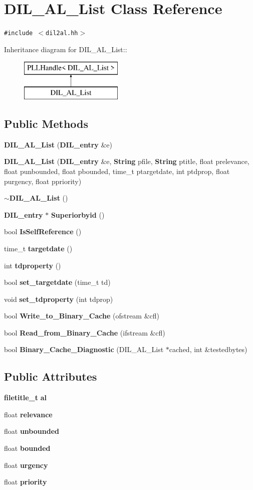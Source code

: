 \section{DIL\_\-AL\_\-List  Class Reference}
\label{classDIL__AL__List}
{\tt \#include $<$dil2al.hh$>$}

Inheritance diagram for DIL\_\-AL\_\-List::\begin{figure}[H]
\begin{center}
\leavevmode
\includegraphics[height=2cm]{classDIL__AL__List}
\end{center}
\end{figure}
\subsection*{Public Methods}
\begin{CompactItemize}
\item 
{\bf DIL\_\-AL\_\-List} ({\bf DIL\_\-entry} \&e)
\item 
{\bf DIL\_\-AL\_\-List} ({\bf DIL\_\-entry} \&e, {\bf String} pfile, {\bf String} ptitle, float prelevance, float punbounded, float pbounded, time\_\-t ptargetdate, int ptdprop, float purgency, float ppriority)
\item 
{\bf $\sim$DIL\_\-AL\_\-List} ()
\item 
{\bf DIL\_\-entry} $\ast$ {\bf Superiorbyid} ()
\item 
bool {\bf Is\-Self\-Reference} ()
\item 
time\_\-t {\bf targetdate} ()
\item 
int {\bf tdproperty} ()
\item 
bool {\bf set\_\-targetdate} (time\_\-t td)
\item 
void {\bf set\_\-tdproperty} (int tdprop)
\item 
bool {\bf Write\_\-to\_\-Binary\_\-Cache} (ofstream \&cfl)
\item 
bool {\bf Read\_\-from\_\-Binary\_\-Cache} (ifstream \&cfl)
\item 
bool {\bf Binary\_\-Cache\_\-Diagnostic} (DIL\_\-AL\_\-List $\ast$cached, int \&testedbytes)
\end{CompactItemize}
\subsection*{Public Attributes}
\begin{CompactItemize}
\item 
{\bf filetitle\_\-t} {\bf al}
\item 
float {\bf relevance}
\item 
float {\bf unbounded}
\item 
float {\bf bounded}
\item 
float {\bf urgency}
\item 
float {\bf priority}
\end{CompactItemize}
